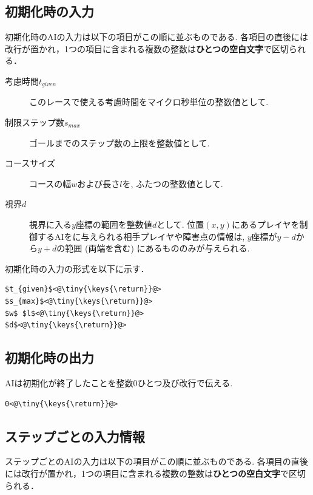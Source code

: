 \documentclass[11pt]{jarticle}
\begin{document}
\subsection{初期化時の入力}
初期化時のAIの入力は以下の項目がこの順に並ぶものである.
各項目の直後には改行が置かれ，1つの項目に含まれる複数の整数は{\bf ひとつの空白文字}で区切られる．
\begin{description}
\item[考慮時間$t_{given}$] このレースで使える考慮時間をマイクロ秒単位の整数値として.
\item[制限ステップ数$s_{max}$] ゴールまでのステップ数の上限を整数値として.
\item[コースサイズ] コースの幅$w$および長さ$l$を, ふたつの整数値として.
\item[視界$d$] 視界に入る$y$座標の範囲を整数値$d$として.
  位置$(x,y)$にあるプレイヤを制御するAIをに与えられる相手プレイヤや障害点の情報は, 
  $y$座標が$y-d$から$y+d$の範囲 (両端を含む) にあるもののみが与えられる.
\end{description}

\makeatletter
\def\lst@visiblespace{$\color{Gray}{}_{
  \mbox{\kern.06em\vrule \@height.3ex}%
  \vbox{\hrule \@width.3em}%
  \hbox{\vrule \@height.3ex}}$}
\makeatother


初期化時の入力の形式を以下に示す．
\begin{lstlisting}
$t_{given}$<@\tiny{\keys{\return}}@>
$s_{max}$<@\tiny{\keys{\return}}@>
$w$ $l$<@\tiny{\keys{\return}}@>
$d$<@\tiny{\keys{\return}}@>
\end{lstlisting}

\subsection{初期化時の出力}
AIは初期化が終了したことを整数$0$ひとつ及び改行で伝える.

\begin{lstlisting}
0<@\tiny{\keys{\return}}@>
\end{lstlisting}

\subsection{ステップごとの入力情報}
ステップごとのAIの入力は以下の項目がこの順に並ぶものである.
各項目の直後には改行が置かれ，1つの項目に含まれる複数の整数は{\bf ひとつの空白文字}で区切られる．
\end{document}
